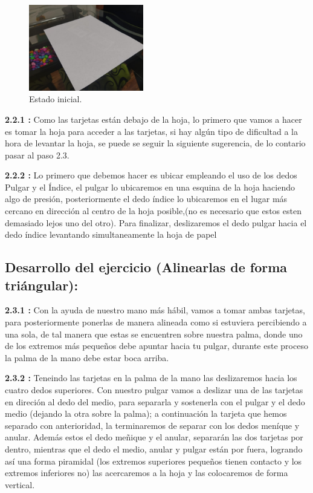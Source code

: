 \documentclass{article}
\begin{document}
\begin{figure}[h]
\includegraphics[width=5cm]{estado inicial.jpeg}
\centering
\caption{Estado inicial.}
\label{fig:inicial}
\end{figure}

\textbf{2.2.1 :} Como las tarjetas están debajo de la hoja, lo primero que vamos a hacer es tomar la     hoja    para acceder a las tarjetas, si hay algún tipo de dificultad a la hora de          levantar la            hoja, se puede se seguir la siguiente sugerencia, de lo contario pasar al paso 2.3.
\newline

\textbf{2.2.2 :} Lo primero que debemos hacer es ubicar empleando el uso de los dedos Pulgar y el Índice, el pulgar lo ubicaremos en una esquina de la hoja haciendo algo de presión, posteriormente  el dedo índice lo ubicaremos en    el  lugar más cercano en dirección al centro de la hoja posible,(no es necesario que estos esten demasiado lejos uno del otro). Para finalizar, deslizaremos el dedo pulgar hacia el dedo índice levantando simultaneamente la hoja de papel


\newline

\subsection{Desarrollo del ejercicio (Alinearlas de forma triángular): } 
\newline

\textbf{2.3.1 :}  Con la ayuda de nuestro mano más hábil, vamos a tomar ambas
tarjetas, para posteriormente ponerlas de manera alineada como si estuviera
percibiendo a una sola, de tal manera que estas se encuentren sobre nuestra
palma, donde uno de los extremos más pequeños debe apuntar hacia tu pulgar, durante este proceso la palma de la mano debe estar boca arriba.
\newline
   
\textbf{2.3.2 :} Teneindo las tarjetas en la palma de la mano las deslizaremos hacia los cuatro dedos superiores. Con nuestro pulgar vamos a deslizar una de las tarjetas en direción al dedo del medio, para separarla y sostenerla con el pulgar y el dedo medio (dejando la otra sobre la palma); a continuación la tarjeta que hemos separado con anterioridad, la terminaremos de separar con los dedos meníque y anular. Además estos el dedo meñique y el anular, separarán las dos tarjetas por dentro, mientras que el dedo el medio, anular y pulgar están por fuera, logrando así una forma piramidal (los extremos superiores pequeños tienen contacto y los extremos inferiores no) las acercaremos a la hoja y las colocaremos de forma vertical.
\newline
   
\end{document}
